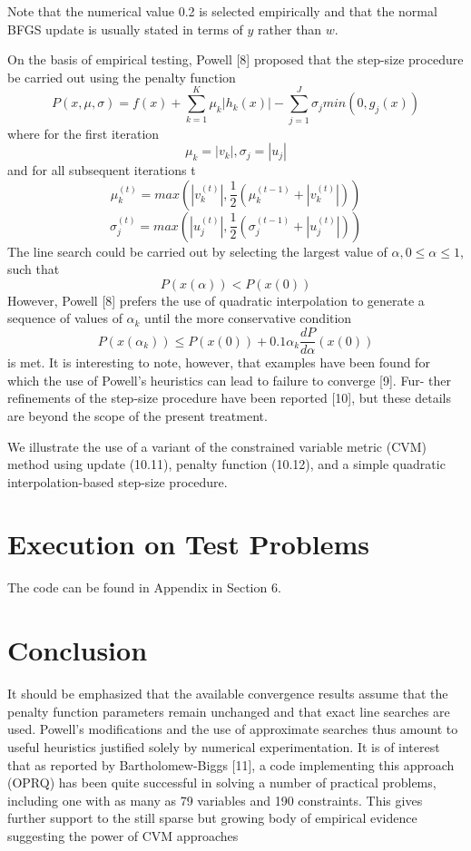 \documentclass{article}
\begin{document}
Note that the numerical value 0.2 is selected empirically and that the normal
BFGS update is usually stated in terms of $y$ rather than $w$.\par
On the basis of empirical testing, Powell [8] proposed that the step-size
procedure be carried out using the penalty function
\[P(x, \mu, \sigma) = f(x) + \sum_{k=1}^{K} \mu_k|h_k(x)| - \sum_{j=1}^{J} \sigma_j min(0,g_j(x))\]
where for the first iteration
\[\mu_k = |v_k|, \sigma_j = |u_j|\]
and for all subsequent iterations t
\[\mu_k^{(t)} = max(|v_k^{(t)}|,\frac{1}{2}(\mu_k^{(t-1)} + |v_k^{(t)}|))\]
\[\sigma_j^{(t)} = max(|u_j^{(t)}|,\frac{1}{2}(\sigma_j^{(t-1)} + |u_j^{(t)}|))\]
The line search could be carried out by selecting the largest value of $\alpha , 0 \leq \alpha \leq1$, such that
\[P(x(\alpha)) < P(x(0))\]
However, Powell [8] prefers the use of quadratic interpolation to generate a
sequence of values of $\alpha_k$ until the more conservative condition
\[P(x(\alpha_k)) \leq P(x(0)) + 0.1\alpha_k\frac{dP}{d\alpha}(x(0))\]
is met. It is interesting to note, however, that examples have been found for
which the use of Powell’s heuristics can lead to failure to converge [9]. Fur-
ther refinements of the step-size procedure have been reported [10], but these
details are beyond the scope of the present treatment.\par
We illustrate the use of a variant of the constrained variable metric (CVM)
method using update (10.11), penalty function (10.12), and a simple quadratic
interpolation-based step-size procedure.


\section{Execution on Test Problems}

The code can be found in Appendix in Section 6.

\section{Conclusion}

It should be emphasized that the available convergence results assume that the penalty function parameters remain unchanged and that exact line searches are used. Powell’s modifications and the use of approximate searches thus amount to useful heuristics justified solely by numerical experimentation. It is of interest that as reported by Bartholomew-Biggs [11], a code implementing this approach (OPRQ) has been quite successful in solving a number of practical problems, including one with as many as 79 variables and 190 constraints. This gives further support to the still sparse but growing body of empirical evidence suggesting the power of CVM approaches
\end{document}
